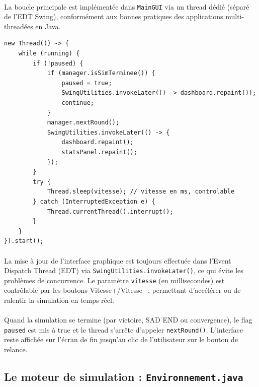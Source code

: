 \paragraph{} La boucle principale est implémentée dans \texttt{MainGUI} via un thread dédié (séparé de l'EDT Swing), conformément aux bonnes pratiques des applications multi-threadées en Java.

\begin{lstlisting}[caption={Boucle principale dans MainGUI (thread dédié)}]
new Thread(() -> {
    while (running) {
        if (!paused) {
            if (manager.isSimTerminee()) {
                paused = true;
                SwingUtilities.invokeLater(() -> dashboard.repaint());
                continue;
            }
            manager.nextRound();
            SwingUtilities.invokeLater(() -> {
                dashboard.repaint();
                statsPanel.repaint();
            });
        }
        try {
            Thread.sleep(vitesse); // vitesse en ms, controlable
        } catch (InterruptedException e) {
            Thread.currentThread().interrupt();
        }
    }
}).start();
\end{lstlisting}

\paragraph{} La mise à jour de l'interface graphique est toujours effectuée dans l'Event Dispatch Thread (EDT) via \texttt{SwingUtilities.invokeLater()}, ce qui évite les problèmes de concurrence. Le paramètre \texttt{vitesse} (en millisecondes) est contrôlable par les boutons Vitesse+/Vitesse$-$, permettant d'accélérer ou de ralentir la simulation en temps réel.

\paragraph{} Quand la simulation se termine (par victoire, SAD END ou convergence), le flag \texttt{paused} est mis à true et le thread s'arrête d'appeler \texttt{nextRound()}. L'interface reste affichée sur l'écran de fin jusqu'au clic de l'utilisateur sur le bouton de relance.

\bigskip

\subsection{Le moteur de simulation : \texttt{Environnement.java}}

